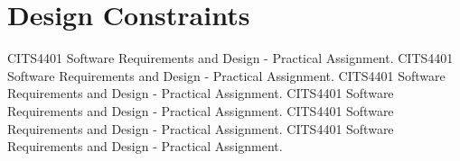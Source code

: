 \section{Design Constraints}

\par
CITS4401 Software Requirements and Design - Practical Assignment.
CITS4401 Software Requirements and Design - Practical Assignment.
CITS4401 Software Requirements and Design - Practical Assignment.
CITS4401 Software Requirements and Design - Practical Assignment.
CITS4401 Software Requirements and Design - Practical Assignment.
CITS4401 Software Requirements and Design - Practical Assignment.